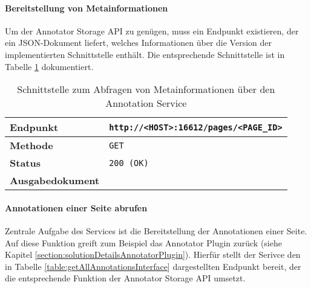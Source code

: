     \paragraph{Bereitstellung von Metainformationen}
    Um der Annotator Storage API zu genügen,
    muss ein Endpunkt existieren, der ein JSON-Dokument liefert,
    welches Informationen über die Version der implementierten Schnittstelle enthält.
    Die entsprechende Schnittstelle ist in Tabelle
    \ref{table:annotationServiceMetaInterface} dokumentiert.


    \begin{table}[htb]
        \centering
        \begin{tabular}{|l|l|}
            \hline
            \textbf{Endpunkt} & \texttt{http://<HOST>:16612/pages/<PAGE\_ID>}\\
            \hline
            \textbf{Methode} & \texttt{GET}\\
            \hline
            \textbf{Status} & \texttt{200 (OK)}\\
            \hline
            \textbf{Ausgabedokument} & \\
            \hline
        \end{tabular}
        \caption{Schnittstelle zum Abfragen von Metainformationen über den Annotation Service}
        \label{table:annotationServiceMetaInterface}
    \end{table}

    \paragraph{Annotationen einer Seite abrufen}
    Zentrale Aufgabe des Services ist die Bereitstellung der Annotationen einer Seite.
    Auf diese Funktion greift zum Beispiel das Annotator Plugin zurück
    (siehe Kapitel \ref{section:solutionDetailsAnnotatorPlugin}).
    Hierfür stellt der Serivce den in Tabelle \ref{table:getAllAnnotationsInterface}
    dargestellten Endpunkt bereit, der die entsprechende Funktion der Annotator Storage API
    umsetzt.
    
